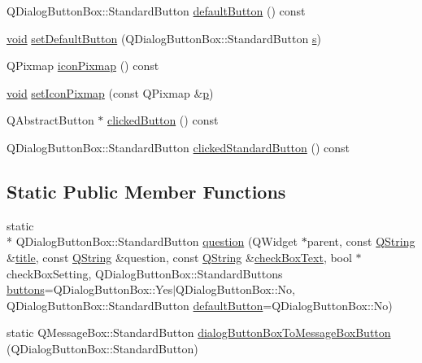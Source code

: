 \begin{DoxyCompactItemize}
\item 
Q\-Dialog\-Button\-Box\-::\-Standard\-Button \hyperlink{class_utils_1_1_checkable_message_box_a1b70174fedfd329a275043a32afd56cc}{default\-Button} () const 
\item 
\hyperlink{group___u_a_v_objects_plugin_ga444cf2ff3f0ecbe028adce838d373f5c}{void} \hyperlink{class_utils_1_1_checkable_message_box_ad5b6b948af48813620a34c67026bd0ab}{set\-Default\-Button} (Q\-Dialog\-Button\-Box\-::\-Standard\-Button \hyperlink{glext_8h_ad585a1393cfa368fa9dc3d8ebff640d5}{s})
\item 
Q\-Pixmap \hyperlink{class_utils_1_1_checkable_message_box_afa4f7d3a30eabc91df73788016604cd2}{icon\-Pixmap} () const 
\item 
\hyperlink{group___u_a_v_objects_plugin_ga444cf2ff3f0ecbe028adce838d373f5c}{void} \hyperlink{class_utils_1_1_checkable_message_box_a93343c79b51e90e9fdc244687f693286}{set\-Icon\-Pixmap} (const Q\-Pixmap \&\hyperlink{glext_8h_aa5367c14d90f462230c2611b81b41d23}{p})
\item 
Q\-Abstract\-Button $\ast$ \hyperlink{class_utils_1_1_checkable_message_box_aed309ded98776c484412478579990aa4}{clicked\-Button} () const 
\item 
Q\-Dialog\-Button\-Box\-::\-Standard\-Button \hyperlink{class_utils_1_1_checkable_message_box_ad5ae85803dbcf70caf0a9a8fff6794b1}{clicked\-Standard\-Button} () const 
\end{DoxyCompactItemize}
\subsection*{Static Public Member Functions}
\begin{DoxyCompactItemize}
\item 
static \\*
Q\-Dialog\-Button\-Box\-::\-Standard\-Button \hyperlink{class_utils_1_1_checkable_message_box_ab06a80f3d8dab0a2c5f5957dfe2409fc}{question} (Q\-Widget $\ast$parent, const \hyperlink{group___u_a_v_objects_plugin_gab9d252f49c333c94a72f97ce3105a32d}{Q\-String} \&\hyperlink{_parse_e_k_f_log_8m_a5df555a5fed35967e041e4abd1269b4e}{title}, const \hyperlink{group___u_a_v_objects_plugin_gab9d252f49c333c94a72f97ce3105a32d}{Q\-String} \&question, const \hyperlink{group___u_a_v_objects_plugin_gab9d252f49c333c94a72f97ce3105a32d}{Q\-String} \&\hyperlink{class_utils_1_1_checkable_message_box_a47682e1634b9d1806e19abc75a3d13dc}{check\-Box\-Text}, bool $\ast$check\-Box\-Setting, Q\-Dialog\-Button\-Box\-::\-Standard\-Buttons \hyperlink{class_utils_1_1_checkable_message_box_a130bcf930f0446f5129b81504ce70e82}{buttons}=Q\-Dialog\-Button\-Box\-::\-Yes$|$Q\-Dialog\-Button\-Box\-::\-No, Q\-Dialog\-Button\-Box\-::\-Standard\-Button \hyperlink{class_utils_1_1_checkable_message_box_ab3ac6c8016a1f22d503293af7434db0f}{default\-Button}=Q\-Dialog\-Button\-Box\-::\-No)
\item 
static Q\-Message\-Box\-::\-Standard\-Button \hyperlink{class_utils_1_1_checkable_message_box_a0bb1ba3ba531e124dfb8d1b129755c47}{dialog\-Button\-Box\-To\-Message\-Box\-Button} (Q\-Dialog\-Button\-Box\-::\-Standard\-Button)
\end{DoxyCompactItemize}
